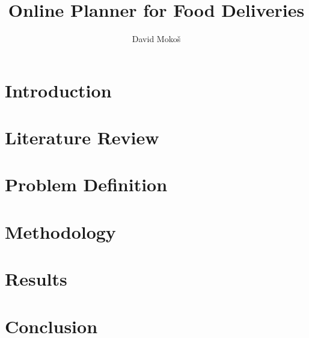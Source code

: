 \documentclass[thesis=M,english]{FITthesis}[2012/10/20]
\title{Online Planner for Food Deliveries}
\author{David Moko{\v s}} %
\begin{document}
\chapter{Introduction} \label{chapter:introduction}


\chapter{Literature Review} \label{chapter:literature}


\chapter{Problem Definition} \label{chapter:problem}


\chapter{Methodology} \label{chapter:methodology}


\chapter{Results} \label{chapter:results}


\chapter{Conclusion} \label{chapter:conclusion}





\appendix
\end{document}

